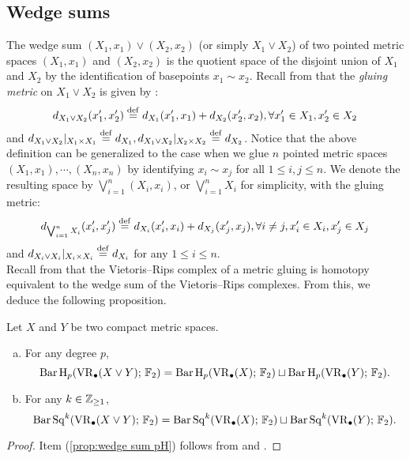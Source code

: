 \subsection{Wedge sums}

The wedge sum $(X_1,x_1)\vee (X_2,x_2)$ (or simply $X_1\vee X_2$) of two pointed metric spaces $(X_1,x_1)$ and $(X_2,x_2)$ is the quotient space of the disjoint union of $X_1$ and $X_2$ by the identification of basepoints $x_1\sim x_2$.
Recall from \cite{burago2001course} that the \emph{gluing metric} on $X_1\vee X_2$ is given by \label{para:gluing}: %
$$d_{X_1\vee X_2}(x_1',x_2')\stackrel{\mathrm{def}}{=} d_{X_1}(x_1',x_1)+d_{X_2}(x_2',x_2),\forall x_1'\in X_1, x_2'\in X_2$$
and $d_{X_1\vee X_2}\vert_{X_1\times X_1}\stackrel{\mathrm{def}}{=} d_{X_1},d_{X_1\vee X_2}\vert_{X_2\times X_2}\stackrel{\mathrm{def}}{=} d_{X_2}$. Notice that the above definition can be generalized to the case when we glue $n$ pointed metric spaces $(X_1,x_1),\cdots,(X_n,x_n)$ by identifying $x_i\sim x_j$ for all $1\leq i,j\leq n$. We denote the resulting space by $\bigvee_{i=1}^n (X_i,x_i)$, or $\bigvee_{i=1}^n X_i$ for simplicity, with the gluing metric:
$$d_{\bigvee_{i=1}^n X_i}(x_i',x_j')\stackrel{\mathrm{def}}{=} d_{X_i}(x_i',x_i)+d_{X_j}(x_j',x_j),\forall i\neq j, x_i'\in X_i, x_j'\in X_j$$
and $d_{X_i\vee X_i}|_{X_i\times X_i}\stackrel{\mathrm{def}}{=} d_{X_i}$ for any $1\leq i\leq n$.\\


Recall from \cite[Proposition 3.7]{adamaszek2020homotopy} that the Vietoris--Rips complex of a metric gluing is homotopy equivalent to the wedge sum of the Vietoris--Rips complexes. From this, we deduce the following proposition. 

\begin{proposition}\label{prop:wedge sum}
	Let $X$ and $Y$ be two compact metric spaces.
	\begin{enumerate}[(a)]
		\item\label{prop:wedge sum pH} For any degree $p$,
		\begin{equation*}\label{eq:wedge sum pH}
			\operatorname{Bar} \operatorname{H}_{p}(\operatorname{VR}_\bullet(X\vee Y);\,{\mathbb{F}_2})= \operatorname{Bar} \operatorname{H}_{p}(\operatorname{VR}_\bullet(X);\,{\mathbb{F}_2})\sqcup \operatorname{Bar} \operatorname{H}_{p}(\operatorname{VR}_\bullet(Y);\,{\mathbb{F}_2}).
		\end{equation*}
		\item\label{prop:wedge sum Sq} For any $k\in \mathbb{Z}_{\geq 1}$,
		\begin{equation*}\label{eq:wedge sum Sq}
			\operatorname{Bar}\operatorname{Sq}^{k}(\operatorname{VR}_\bullet(X\vee Y);\,{\mathbb{F}_2})= \operatorname{Bar}\operatorname{Sq}^{k}(\operatorname{VR}_\bullet(X);\,{\mathbb{F}_2})\sqcup \operatorname{Bar}\operatorname{Sq}^{k}(\operatorname{VR}_\bullet(Y);\,{\mathbb{F}_2}).
		\end{equation*}
	\end{enumerate}
\end{proposition}
\begin{proof}
	Item (\ref{prop:wedge sum pH}) follows from \cite[Proposition 3.7]{adamaszek2020homotopy} and \cite[Thoerem 9 (2)]{lim2020vietoris}.

\end{proof}

